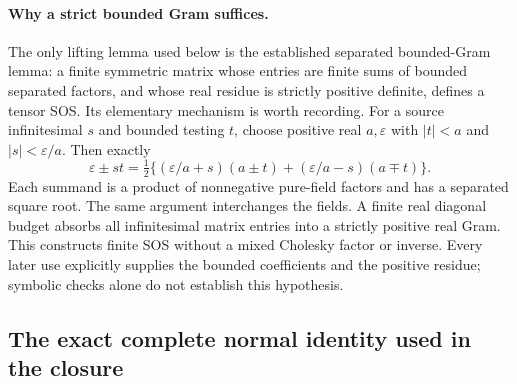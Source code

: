 \paragraph{Why a strict bounded Gram suffices.}
The only lifting lemma used below is the established separated
bounded-Gram lemma: a finite symmetric matrix whose entries are
finite sums of bounded separated factors, and whose real residue
is strictly positive definite, defines a tensor SOS. Its elementary
mechanism is worth recording. For a source infinitesimal $s$ and
bounded testing $t$, choose positive real $a,\varepsilon$ with
$|t|<a$ and $|s|<\varepsilon/a$. Then exactly
\[
 \varepsilon\pm st=\tfrac12
 \{(\varepsilon/a+s)(a\pm t)
            +(\varepsilon/a-s)(a\mp t)\}.
\]
Each summand is a product of nonnegative pure-field factors and
has a separated square root. The same argument interchanges the
fields. A finite real diagonal budget absorbs all infinitesimal
matrix entries into a strictly positive real Gram. This constructs
finite SOS without a mixed Cholesky factor or inverse. Every later
use explicitly supplies the bounded coefficients and the positive
residue; symbolic checks alone do not establish this hypothesis.

\subsection*{The exact complete normal identity used in the closure}

